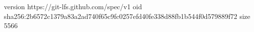 version https://git-lfs.github.com/spec/v1
oid sha256:2b6572c1379a83a2ad740f65c9fc0257efd40fe338d88fb1b544f0d579889f72
size 5566
